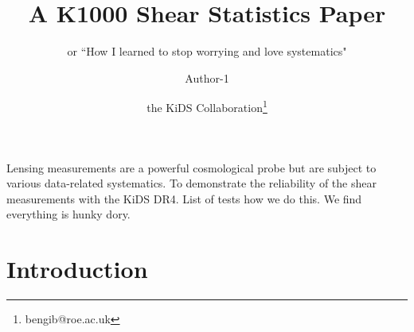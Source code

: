 \documentclass{aa}
\begin{document}
 


   \title{A K1000 Shear Statistics Paper}

   \subtitle{or ``How I learned to stop worrying and love systematics"}

   \author{Author-1
          \and
          the KiDS Collaboration\thanks{bengib@roe.ac.uk}
          }



 
  \abstract
   {Lensing measurements are a powerful cosmological probe but are subject to various data-related systematics.}
   {To demonstrate the reliability of the shear measurements with the KiDS DR4.}
   {List of tests how we do this.}
   {We find everything is hunky dory.}
   {}


   \maketitle
%

\section{Introduction}
\end{document}

